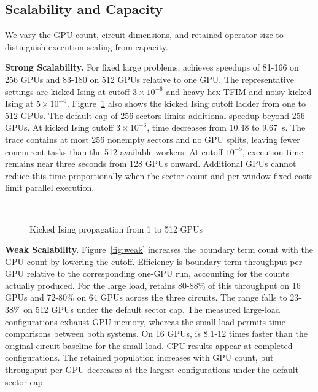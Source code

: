 \subsection{Scalability and Capacity}
We vary the GPU count, circuit dimensions, and retained operator size to distinguish execution scaling from capacity.

\noindent\textbf{Strong Scalability.}
For fixed large problems, \SectorQ achieves speedups of 81-166 on 256 GPUs and 83-180 on 512 GPUs relative to one GPU.
The representative settings are kicked Ising at cutoff $3\times10^{-6}$ and heavy-hex TFIM and noisy kicked Ising at $5\times10^{-6}$.
Figure~\ref{fig:scaleout} also shows the kicked Ising cutoff ladder from one to 512 GPUs.
The default cap of 256 sectors limits additional speedup beyond 256 GPUs.
At kicked Ising cutoff $3\times10^{-6}$, time decreases from 10.48 to 9.67~s.
The trace contains at most 256 nonempty sectors and no GPU splits, leaving fewer concurrent tasks than the 512 available workers.
At cutoff $10^{-5}$, execution time remains near three seconds from 128 GPUs onward.
Additional GPUs cannot reduce this time proportionally when the sector count and per-window fixed costs limit parallel execution.

\begin{figure}[t]
\centering
{}\\[-2pt]
\caption{Kicked Ising propagation from 1 to 512 GPUs}
\label{fig:scaleout}
\end{figure}

\noindent\textbf{Weak Scalability.}
Figure~\ref{fig:weak} increases the boundary term count with the GPU count by lowering the cutoff.
Efficiency is boundary-term throughput per GPU relative to the corresponding one-GPU run, accounting for the counts actually produced.
For the large load, \SectorQ retains 80-88\% of this throughput on 16 GPUs and 72-80\% on 64 GPUs across the three circuits.
The range falls to 23-38\% on 512 GPUs under the default sector cap.
The measured large-load \cuPP configurations exhaust GPU memory, whereas the small load permits time comparisons between both systems.
On 16 GPUs, \SectorQ is 8.1-12 times faster than the original-circuit baseline for the small load.
CPU results appear at completed configurations.
The retained population increases with GPU count, but throughput per GPU decreases at the largest configurations under the default sector cap.

